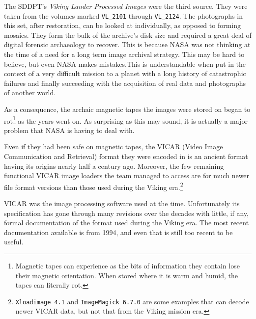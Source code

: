 The SDDPT's {\it Viking Lander Processed Images} were the third source. They were taken from the volumes marked {\tt VL_2101} through {\tt VL_2124}. The photographs in this set, after restoration, can be looked at individually, as opposed to forming mosaics. They form the bulk of the archive's disk size and required a great deal of digital forensic archaeology to recover. This is because NASA was not thinking at the time of a need for a long term image archival strategy. This may be hard to believe, but even NASA makes mistakes. This is understandable when put in the context of a very difficult mission to a planet with a long history of catastrophic failures and finally succeeding with the acquisition of real data and photographs of another world.

    {}

As a consequence, the archaic magnetic tapes the images were stored on began to rot\footnote{Magnetic tapes can experience  as the bits of information they contain lose their magnetic orientation. When stored where it is warm and humid, the tapes can literally rot.} as the years went on. As surprising as this may sound, it is actually a major problem that NASA is having to deal with.

Even if they had been safe on magnetic tapes, the VICAR (Video Image Communication and Retrieval) format they were encoded in is an ancient format having its origins nearly half a century ago. Moreover, the few remaining functional VICAR image loaders the team managed to access are for much newer file format versions than those used during the Viking era.\footnote{{\tt Xloadimage 4.1} and {\tt ImageMagick 6.7.0} are some examples that can decode newer VICAR data, but not that from the Viking mission era.}

VICAR was the image processing software used at the time. Unfortunately its specification has gone through many revisions over the decades with little, if any, formal documentation of the format used during the Viking era. The most recent documentation available is from 1994, and even that is still too recent to be useful.

